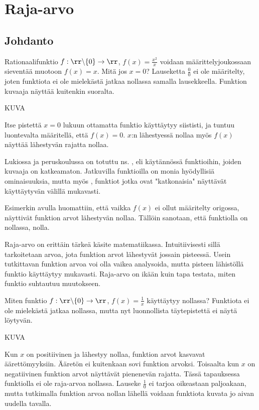 \chapter{Raja-arvo}

\section{Johdanto}

Rationaalifunktio $f: \rr \backslash \{0 \} \to \rr$, $f(x) = \frac{x^2}{x}$ voidaan määrittelyjoukossaan sieventää muotoon $f(x) = x$. Mitä jos $x = 0$? Lauseketta $\frac{0}{0}$ ei ole määritelty, joten funktiota ei ole mielekästä jatkaa nollassa samalla lausekkeella. Funktion kuvaaja näyttää kuitenkin suoralta.

KUVA

Itse pistettä $x = 0$ lukuun ottamatta funktio käyttäytyy siististi, ja tuntuu luontevalta määritellä, että $f(x) = 0$. $x$:n lähestyessä nollaa myös $f(x)$ näyttää lähestyvän rajatta nollaa.

Lukiossa ja peruskoulussa on totuttu ns. , eli käytännössä funktioihin, joiden kuvaaja on katkeamaton. Jatkuvilla funktioilla on monia hyödyllisiä ominaisuuksia, mutta myös , funktiot jotka ovat "katkonaisia" näyttävät käyttäytyvän välillä mukavasti.

Esimerkin avulla huomattiin, että vaikka $f(x)$ ei ollut määritelty origossa, näyttivät funktion arvot lähestyvän nollaa.  Tällöin sanotaan, että funktiolla on  nollassa, nolla.

Raja-arvo on erittäin tärkeä käsite matematiikassa. Intuitiivisesti sillä tarkoitetaan arvoa, jota funktion arvot lähestyvät jossain pisteessä. Usein tutkittavan funktion arvoa voi olla vaikea analysoida, mutta pisteen lähistöllä funktio käyttäytyy mukavasti. Raja-arvo on ikään kuin tapa testata, miten funktio suhtautuu muutokseen.

Miten funktio  $f: \rr \backslash \{0 \} \to \rr$, $f(x) = \frac{1}{x}$ käyttäytyy nollassa? Funktiota ei ole mielekästä jatkaa nollassa, mutta nyt luonnollista täytepistettä ei näytä löytyvän.

KUVA

Kun $x$ on positiivinen ja lähestyy nollaa, funktion arvot kasvavat äärettömyyksiin. Ääretön ei kuitenkaan sovi funktion arvoksi. Toisaalta kun $x$ on negatiivinen funktion arvot näyttävät pienenevän rajatta. Tässä tapauksessa funktiolla ei ole raja-arvoa nollassa. Lauseke $\frac{1}{0}$ ei tarjoa oikeastaan paljoakaan, mutta tutkimalla funktion arvoa nollan lähellä voidaan funktiota kuvata jo aivan uudella tavalla.

